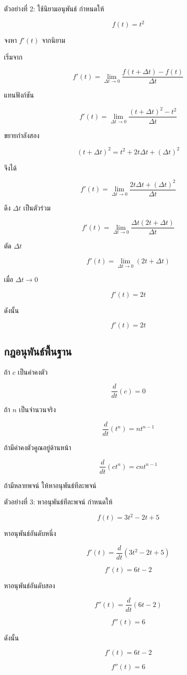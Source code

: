 \begin{examplebox}{ตัวอย่างที่ 2: ใช้นิยามอนุพันธ์}
กำหนดให้

\[
f(t)=t^2
\]

จงหา $f'(t)$ จากนิยาม

เริ่มจาก

\[
f'(t)=\lim_{\Delta t\to 0}
\frac{f(t+\Delta t)-f(t)}{\Delta t}
\]

แทนฟังก์ชัน

\[
f'(t)=\lim_{\Delta t\to 0}
\frac{(t+\Delta t)^2-t^2}{\Delta t}
\]

ขยายกำลังสอง

\[
(t+\Delta t)^2=t^2+2t\Delta t+(\Delta t)^2
\]

จึงได้

\[
f'(t)=\lim_{\Delta t\to 0}
\frac{2t\Delta t+(\Delta t)^2}{\Delta t}
\]

ดึง $\Delta t$ เป็นตัวร่วม

\[
f'(t)=\lim_{\Delta t\to 0}
\frac{\Delta t(2t+\Delta t)}{\Delta t}
\]

ตัด $\Delta t$

\[
f'(t)=\lim_{\Delta t\to 0}(2t+\Delta t)
\]

เมื่อ $\Delta t\to 0$

\[
f'(t)=2t
\]

ดังนั้น

\[
\boxed{f'(t)=2t}
\]
\end{examplebox}

\subsection{กฎอนุพันธ์พื้นฐาน}

\begin{tcolorbox}[title=กฎอนุพันธ์พื้นฐาน]
ถ้า $c$ เป็นค่าคงตัว

\[
\frac{d}{dt}(c)=0
\]

ถ้า $n$ เป็นจำนวนจริง

\[
\frac{d}{dt}(t^n)=nt^{n-1}
\]

ถ้ามีค่าคงตัวคูณอยู่ด้านหน้า

\[
\frac{d}{dt}(ct^n)=cnt^{n-1}
\]

ถ้ามีหลายพจน์ ให้หาอนุพันธ์ทีละพจน์
\end{tcolorbox}

\begin{examplebox}{ตัวอย่างที่ 3: หาอนุพันธ์ทีละพจน์}
กำหนดให้

\[
f(t)=3t^2-2t+5
\]

หาอนุพันธ์อันดับหนึ่ง

\[
f'(t)=\frac{d}{dt}(3t^2-2t+5)
\]

\[
f'(t)=6t-2
\]

หาอนุพันธ์อันดับสอง

\[
f''(t)=\frac{d}{dt}(6t-2)
\]

\[
f''(t)=6
\]

ดังนั้น

\[
\boxed{f'(t)=6t-2}
\]

\[
\boxed{f''(t)=6}
\]
\end{examplebox}

